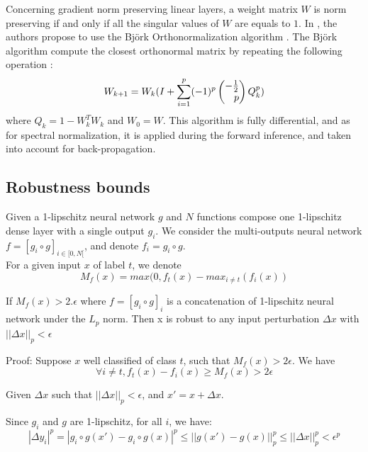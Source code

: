 Concerning gradient norm preserving linear layers, a weight matrix $W$ is norm preserving if and only if all the singular values of $W$ are equals to $1$. In \cite{pmlr-v97-anil19a}, the authors propose to use the Björk Orthonormalization algorithm \cite{bjorck71Ortho}. The Björk algorithm compute the closest orthonormal matrix by repeating the following operation :
\begin{equation}
    W_{k+1}=W_k(I+\sum_{i=1}^p(-1)^p \Spvek{-\frac{1}{2};p} Q_k^p)
\end{equation}
where $Q_k=1-W^T_kW_k$ and $W_0=W$.
This algorithm is fully differential, and as for spectral normalization, it is applied during the forward inference, and taken into account for back-propagation.
\subsection{Robustness bounds}
\label{sec:robustness_bounds}

Given a 1-lipschitz neural network $g$ and $N$  functions compose one 1-lipschitz dense layer with a single output $g_i$. We consider the multi-outputs neural network $f=[g_i\circ g]_{i\in[0,N[}$, and denote $f_i=g_i\circ g$.\\

For a given input $x$ of label $t$, we denote
\[
M_f(x) = max(0,f_t(x)-max_{i\neq t}(f_i(x))
\]

\begin{Theorem}
If $M_f(x)>2.\epsilon$ where $f=[g_i\circ g]_i$ is a concatenation of 1-lipschitz neural network under the $L_p$ norm. Then x is robust to any input perturbation $\Delta x$ with $||\Delta x||_p< \epsilon$
\end{Theorem}


Proof:
Suppose $x$ well classified of class $t$, such that $M_f(x) > 2\epsilon$.
We have 
\begin{equation*}
\forall i \neq t, f_t(x)-f_i(x) \geq M_f(x) > 2\epsilon
\end{equation*}

Given $\Delta x$ such that $||\Delta x||_p< \epsilon$, and $x'=x+\Delta x$.

Since $g_i$ and $g$ are 1-lipschitz, for all $i$, we have:
\begin{equation*}
|\Delta y_i|^p=|g_i\circ g(x')-g_i\circ g(x)|^p\leq ||g(x')-g(x)||_p^p \leq ||\Delta x||_p^p < \epsilon^p
\end{equation*}


